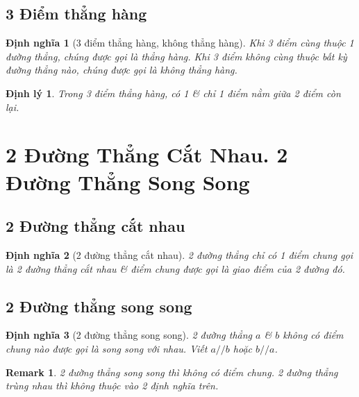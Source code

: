 \documentclass[oneside]{book}
\numberwithin{equation}{section}
\newtheorem{dinhnghia}{Định nghĩa}[section]
\newtheorem{remark}{Remark}[section]
\newtheorem{dinhly}{Định lý}[section]
\begin{document}
\subsection{3 Điểm thẳng hàng}

\begin{dinhnghia}[3 điểm thẳng hàng, không thẳng hàng]
	Khi 3 điểm cùng thuộc 1 đường thẳng, chúng được gọi là \emph{thẳng hàng}. Khi 3 điểm không cùng thuộc bất kỳ đường thẳng nào, chúng được gọi là \emph{không thẳng hàng}.
\end{dinhnghia}

\begin{dinhly}
	Trong 3 điểm thẳng hàng, có 1 \textit{\&} chỉ 1 điểm nằm giữa 2 điểm còn lại.
\end{dinhly}


\section{2 Đường Thẳng Cắt Nhau. 2 Đường Thẳng Song Song}

\subsection{2 Đường thẳng cắt nhau}

\begin{dinhnghia}[2 đường thẳng cắt nhau]
	2 đường thẳng chỉ có 1 điểm chung gọi là \emph{2 đường thẳng cắt nhau} \textit{\&} điểm chung được gọi là \emph{giao điểm} của 2 đường đó.
\end{dinhnghia}

\subsection{2 Đường thẳng song song}

\begin{dinhnghia}[2 đường thẳng song song]
	2 đường thẳng $a$ \textit{\&} $b$ không có điểm chung nào được gọi là \emph{song song với nhau}. Viết $a//b$ hoặc $b//a$.
\end{dinhnghia}

\begin{remark}
	2 đường thẳng song song thì không có điểm chung. 2 đường thẳng \emph{trùng nhau} thì không thuộc vào 2 định nghĩa trên.
\end{remark}

\end{document}
